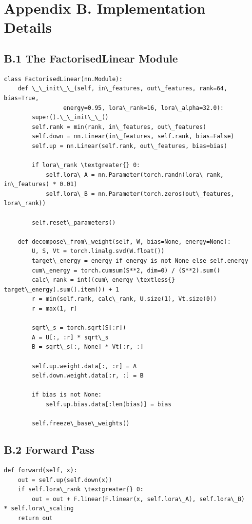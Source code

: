 \section{Appendix B. Implementation Details}

\subsection{B.1 The FactorisedLinear Module}

\begin{lstlisting}
class FactorisedLinear(nn.Module):
    def \_\_init\_\_(self, in\_features, out\_features, rank=64, bias=True,
                 energy=0.95, lora\_rank=16, lora\_alpha=32.0):
        super().\_\_init\_\_()
        self.rank = min(rank, in\_features, out\_features)
        self.down = nn.Linear(in\_features, self.rank, bias=False)
        self.up = nn.Linear(self.rank, out\_features, bias=bias)
        
        if lora\_rank \textgreater{} 0:
            self.lora\_A = nn.Parameter(torch.randn(lora\_rank, in\_features) * 0.01)
            self.lora\_B = nn.Parameter(torch.zeros(out\_features, lora\_rank))
        
        self.reset\_parameters()
    
    def decompose\_from\_weight(self, W, bias=None, energy=None):
        U, S, Vt = torch.linalg.svd(W.float())
        target\_energy = energy if energy is not None else self.energy
        cum\_energy = torch.cumsum(S**2, dim=0) / (S**2).sum()
        calc\_rank = int((cum\_energy \textless{} target\_energy).sum().item()) + 1
        r = min(self.rank, calc\_rank, U.size(1), Vt.size(0))
        r = max(1, r)
        
        sqrt\_s = torch.sqrt(S[:r])
        A = U[:, :r] * sqrt\_s
        B = sqrt\_s[:, None] * Vt[:r, :]
        
        self.up.weight.data[:, :r] = A
        self.down.weight.data[:r, :] = B
        
        if bias is not None:
            self.up.bias.data[:len(bias)] = bias
        
        self.freeze\_base\_weights()
\end{lstlisting}

\subsection{B.2 Forward Pass}

\begin{lstlisting}
def forward(self, x):
    out = self.up(self.down(x))
    if self.lora\_rank \textgreater{} 0:
        out = out + F.linear(F.linear(x, self.lora\_A), self.lora\_B) * self.lora\_scaling
    return out
\end{lstlisting}

